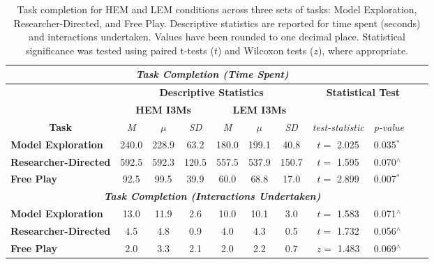 \begin{table*}[!ht]
\caption{Task completion for HEM and LEM conditions across three sets of tasks: Model Exploration, Researcher-Directed, and Free Play. Descriptive statistics are reported for time spent (seconds) and interactions undertaken. Values have been rounded to one decimal place. Statistical significance was tested using paired t-tests ($t$) and Wilcoxon tests ($z$), where appropriate.}
\label{table:10}
\begin{tabular}{@{}ccccccccccclll@{}}
\toprule
\multicolumn{13}{c}{\textit{\textbf{Task Completion (Time Spent)}}} \\ \midrule
\multicolumn{1}{c|}{\multirow{2}{*}{}} &
  \multicolumn{6}{c|}{\textbf{Descriptive Statistics}} &
  \multicolumn{6}{c}{\textbf{Statistical Test}} \\
\multicolumn{1}{c|}{} &
  \multicolumn{3}{c|}{\textbf{HEM I3Ms}} &
  \multicolumn{3}{c|}{\textbf{LEM I3Ms}} &
  \multicolumn{6}{c}{} \\
\multicolumn{1}{c|}{\textbf{Task}} &
 \textit{M} &
  $\mu$ &
  \multicolumn{1}{c|}{\textit{SD}} &
 \textit{M} &
  $\mu$ &
  \multicolumn{1}{c|}{\textit{SD}} &
 \textit{test-statistic} &
 \textit{p-value} &
  \multicolumn{4}{c}{} \\ \midrule
\multicolumn{1}{l|}{\textbf{Model Exploration}} &
  240.0 &
  228.9 &
  \multicolumn{1}{c|}{63.2} &
  180.0 &
  199.1 &
  \multicolumn{1}{c|}{40.8} &
  $t=$ 2.025 &
  \multicolumn{1}{l}{0.035$^\ast$} &
  \multicolumn{4}{c}{} \\
\multicolumn{1}{l|}{\textbf{Researcher-Directed}} &
  592.5 &
  592.3 &
  \multicolumn{1}{c|}{120.5} &
  557.5 &
  537.9 &
  \multicolumn{1}{c|}{150.7} &
  $t=$ 1.595 &
  \multicolumn{1}{l}{0.070$^\wedge$} &
  \multicolumn{4}{c}{} \\
\multicolumn{1}{l|}{\textbf{Free Play}} &
  92.5 &
  99.5 &
  \multicolumn{1}{c|}{39.9} &
  60.0 &
  68.8 &
  \multicolumn{1}{c|}{17.0} &
  $t=$ 2.899 &
  \multicolumn{1}{l}{0.007$^\ast$} &
  \multicolumn{4}{c}{} \\ \midrule
\multicolumn{13}{c}{\textit{\textbf{Task Completion (Interactions Undertaken)}}} \\ \midrule
\multicolumn{1}{l|}{\textbf{Model Exploration}} &
  13.0 &
  11.9 &
  \multicolumn{1}{c|}{2.6} &
  10.0 &
  10.1 &
  \multicolumn{1}{c|}{3.0} &
  $t=$ 1.583 &
  \multicolumn{1}{l}{0.071$^\wedge$} &
  \multicolumn{4}{c}{} \\
\multicolumn{1}{l|}{\textbf{Researcher-Directed}} &
  4.5 &
  4.8 &
  \multicolumn{1}{c|}{0.9} &
  4.0 &
  4.3 &
  \multicolumn{1}{c|}{0.5} &
  $t=$ 1.732 &
  \multicolumn{1}{l}{0.056$^\wedge$} &
  \multicolumn{4}{c}{} \\
\multicolumn{1}{l|}{\textbf{Free Play}} &
  2.0 &
  3.3 &
  \multicolumn{1}{c|}{2.1} &
  2.0 &
  2.2 &
  \multicolumn{1}{c|}{0.7} &
  $z=$ 1.483 &
  \multicolumn{1}{l}{0.069$^\wedge$} &
  \multicolumn{4}{c}{} \\ \bottomrule
\end{tabular}
\end{table*}